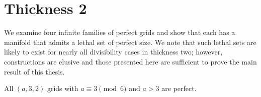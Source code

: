 
\section{Thickness 2}

We examine four infinite families of perfect grids and show that each has a manifold that admits a lethal set of perfect size. We note that such lethal sets are likely to exist for nearly all divisibility cases in thickness two; however, constructions are elusive and those presented here are sufficient to prove the main result of this thesis.

\begin{con}
\label{con:3x2x(3mod6)}
All $(a,3,2)$ grids with $a \equiv 3 \pmod 6$ and $a >3$ are perfect. 
\end{con}

